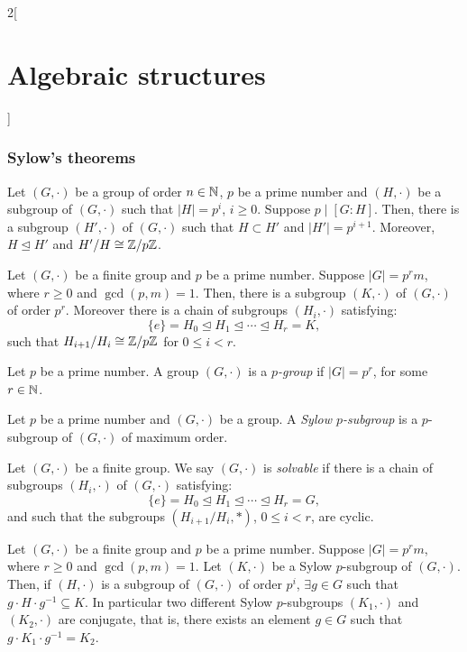 \documentclass[../../../main.tex]{subfiles}
\begin{document}
\begin{multicols}{2}[\section{Algebraic structures}]
    \subsubsection{Sylow's theorems}
    \begin{corollary}
        Let $(G,\cdot)$ be a group of order $n\in\mathbb{N} $, $p$ be a prime number and $(H,\cdot)$ be a subgroup of $(G,\cdot)$ such that $|H|=p^i$, $i\geq 0$. Suppose $p\mid[G:H]$. Then, there is a subgroup $(H',\cdot)$ of $(G,\cdot)$ such that $H\subset H'$ and $|H'|=p^{i+1}$. Moreover, $H\unlhd H'$ and $H'/H\cong\mathbb{Z} /p\mathbb{Z} $.
    \end{corollary}
    \begin{theorem}
        Let $(G,\cdot)$ be a finite group and $p$ be a prime number. Suppose $|G|=p^r m$, where $r\geq 0$ and $\gcd(p,m)=1$. Then, there is a subgroup $(K,\cdot)$ of $(G,\cdot)$ of order $p^r$. Moreover there is a chain of subgroups $(H_i,\cdot)$ satisfying: $$\{e\}=H_0\unlhd H_1\unlhd\cdots\unlhd H_r=K,$$ such that $H_{i+1}/H_i\cong\mathbb{Z} /p\mathbb{Z} $ for $0\leq i<r$.
    \end{theorem}
    \begin{definition}
        Let $p$ be a prime number. A group $(G,\cdot)$ is a \textit{$p$-group} if $|G|=p^r$, for some $r\in\mathbb{N} $.
    \end{definition}
    \begin{definition}
        Let $p$ be a prime number and $(G,\cdot)$ be a group. A \textit{Sylow $p$-subgroup} is a $p$-subgroup of $(G,\cdot)$ of maximum order.
    \end{definition}
    \begin{definition}
        Let $(G,\cdot)$ be a finite group. We say $(G,\cdot)$ is \textit{solvable} if there is a chain of subgroups $(H_i,\cdot)$ of $(G,\cdot)$ satisfying: $$\{e\}=H_0\unlhd H_1\unlhd\cdots\unlhd H_r=G,$$ and such that the subgroups $(H_{i+1}/H_i,*)$, $0\leq i<r$, are cyclic.
    \end{definition}
    \begin{theorem}
        Let $(G,\cdot)$ be a finite group and $p$ be a prime number. Suppose $|G|=p^r m$, where $r\geq 0$ and $\gcd(p,m)=1$. Let $(K,\cdot)$ be a Sylow $p$-subgroup of $(G,\cdot)$. Then, if $(H,\cdot)$ is a subgroup of $(G,\cdot)$ of order $p^i$, $\exists g\in G$ such that $g\cdot H\cdot g^{-1}\subseteq K$. In particular two different Sylow $p$-subgroups $(K_1,\cdot)$ and $(K_2,\cdot)$ are conjugate, that is, there exists an element $g\in G$ such that $g\cdot K_1\cdot g^{-1}=K_2$.

\end{theorem}
\end{multicols}
\end{document}
